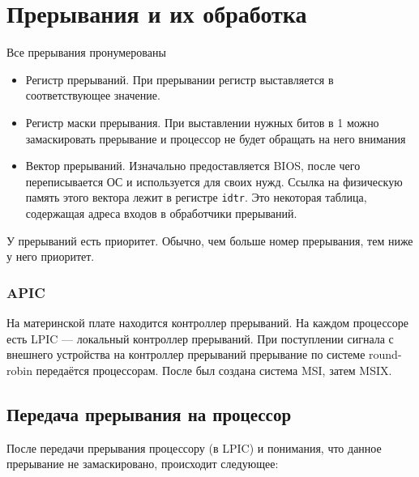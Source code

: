 \section{Прерывания и их обработка}

Все прерывания пронумерованы

\begin{itemize}
\item Регистр прерываний. При прерывании регистр выставляется в соответствующее значение.
\item Регистр маски прерывания. При выставлении нужных битов в 1 можно замаскировать прерывание и процессор не будет обращать на него внимания
\item Вектор прерываний. Изначально предоставляется BIOS, после чего переписывается ОС и используется для своих нужд. Ссылка на физическую память этого вектора лежит в регистре \verb!idtr!. Это некоторая таблица, содержащая адреса входов в обработчики прерываний.
\end{itemize}

У прерываний есть приоритет. Обычно, чем больше номер прерывания, тем ниже у него приоритет.

\subsubsection*{APIC}


На материнской плате находится контроллер прерываний. На каждом процессоре есть LPIC --- локальный контроллер прерываний. При поступлении сигнала с внешнего устройства на контроллер прерываний прерывание по системе round-robin передаётся процессорам. После был создана система MSI, затем MSIX.

\subsection{Передача прерывания на процессор}
После передачи прерывания процессору (в LPIC) и понимания, что данное прерывание не замаскировано, происходит следующее:

